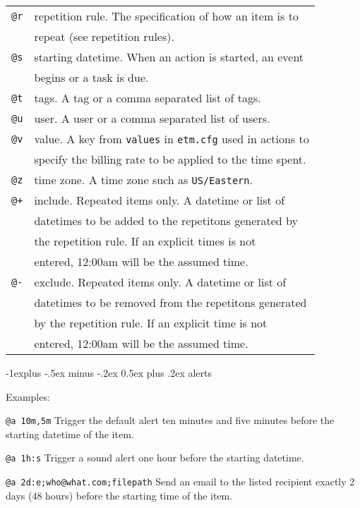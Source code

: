 \documentclass[9pt,landscape]{article}
\makeatletter
\renewcommand{\subsection}{\@startsection{subsection}{2}{0mm}%
                                {-1explus -.5ex minus -.2ex}%
                                {0.5ex plus .2ex}%
                                {\normalfont\normalsize\bfseries}}
\makeatother
\begin{document}
\begin{multicols}{3}
\begin{tabular}{@{}ll@{}}
\texttt{@r} & repetition rule. The specification of how an item is to \\
            & repeat (see repetition rules). \\
\texttt{@s} & starting datetime. When an action is started, an event \\
            & begins or a task is due. \\
\texttt{@t} & tags. A tag or a comma separated list of tags. \\
\texttt{@u} & user. A user or a comma separated list of users. \\
\texttt{@v} & value. A key from \texttt{values} in \texttt{etm.cfg} used in actions to \\
            & specify the billing rate to be applied to the time spent. \\
\texttt{@z} & time zone. A time zone such as \texttt{US/Eastern}. \\
\texttt{@+} & include. Repeated items only. A datetime or list of \\
            & datetimes to be added to the repetitons generated by \\
            & the repetition rule. If an explicit times is not \\
            & entered, 12:00am will be the assumed time.\\
\texttt{@-} & exclude. Repeated items only. A datetime or list of \\
            & datetimes to be removed from the repetitons generated \\
            & by the repetition rule. If an explicit time is not \\
            & entered, 12:00am will be the assumed time. \\

\end{tabular}


\subsection{alerts}

Examples:
\begin{compactdesc}
  \item[\texttt{@a 10m,5m}] Trigger the default alert ten minutes and five minutes before the starting datetime of the item.
  \item[\texttt{@a 1h:s}] Trigger a sound alert one hour before the starting datetime.
  \item[\texttt{@a 2d:e;who@what.com;filepath}] Send an email to the listed recipient exactly 2 days (48 hours) before the starting time of the item.
\end{compactdesc}


\end{multicols}
\end{document}
